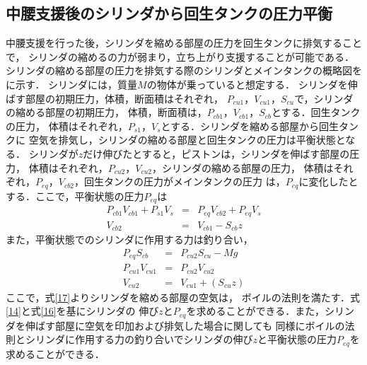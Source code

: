  \subsection{中腰支援後のシリンダから回生タンクの圧力平衡}
 中腰支援を行った後，シリンダを縮める部屋の圧力を回生タンクに排気することで，
 シリンダの縮めるの力が弱まり，立ち上がり支援することが可能である．
 シリンダの縮める部屋の圧力を排気する際のシリンダとメインタンクの概略図を
 に示す．
 シリンダには，質量$M$の物体が乗っていると想定する．
 シリンダを伸ばす部屋の初期圧力，体積，断面積はそれぞれ，
 $P_{cu1}$，$V_{cu1}$，$S_{cu}$で，シリンダの縮める部屋の初期圧力，
 体積，断面積は，$P_{cb1}$，$V_{cb1}$，$S_{cb}$とする．回生タンクの圧力，
 体積はそれぞれ，$P_{s1}$，$V_{s}$とする．シリンダを縮める部屋から回生タンクに
 空気を排気し，シリンダの縮める部屋と回生タンクの圧力は平衡状態となる．
 シリンダが$z$だけ伸びたとすると，ピストンは，シリンダを伸ばす部屋の圧力，
 体積はそれぞれ，$P_{cu2}$，$V_{cu2}$，シリンダの縮める部屋の圧力，
 体積はそれぞれ，$P_{eq}$，$V_{cb2}$，回生タンクの圧力がメインタンクの圧力
 は，$P_{eq}$に変化したとする．ここで，平衡状態の圧力$P_{eq}$は
\begin{eqnarray}
         P_{cb1}V_{cb1} + P_{s1}V_{s} &=& P_{eq}V_{cb2} + P_{eq}V_{s}\label{14}\\
         V_{cb2} &=& V_{cb1} - S_{cb}z
\end{eqnarray}
また，平衡状態でのシリンダに作用する力は釣り合い，
\begin{eqnarray}
         P_{eq}S_{cb} &=& P_{cu2}S_{cu} - Mg\label{16}\\
         P_{cu1}V_{cu1} &=& P_{cu2}V_{cu2}\label{17}\\
         V_{cu2} &=& V_{cu1} + (S_{cu}z)
\end{eqnarray}
ここで，式\eqref{17}よりシリンダを縮める部屋の空気は，
ボイルの法則を満たす．式\eqref{14}と式\eqref{16}を基にシリンダの
伸び$z$と$P_{eq}$を求めることができる．また，シリンダを伸ばす部屋に空気を印加および排気した場合に関しても
同様にボイルの法則とシリンダに作用する力の釣り合いでシリンダの伸び$z$と平衡状態の圧力$P_{eq}$を求めることができる．

